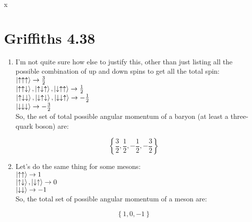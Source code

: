 x\documentclass[12pt]{article}
\begin{document}
\section*{Griffiths 4.38}
\begin{enumerate}[label=\alph*)]
\item I'm not quite sure how else to justify this, other than just listing all the possible combination of up and down spins to get all the total spin:\vspace{0.5em}\\
$\ket{\uparrow\uparrow\uparrow} \rightarrow \frac{3}{2}$\vspace{0.5em}\\
$\ket{\uparrow\uparrow\downarrow}, \ket{\uparrow\downarrow\uparrow}, \ket{\downarrow\uparrow\uparrow} \rightarrow \frac{1}{2}$\vspace{0.5em}\\
$\ket{\uparrow\downarrow\downarrow}, \ket{\downarrow\uparrow\downarrow}, \ket{\downarrow\downarrow\uparrow} \rightarrow -\frac{1}{2}$\vspace{0.5em}\\
$\ket{\downarrow\downarrow\downarrow} \rightarrow -\frac{3}{2}$\vspace{0.5em}\\
So, the set of total possible angular momentum of a baryon (at least a three-quark boson) are:

\[\boxed{\left\{\frac{3}{2}, \frac{1}{2}, -\frac{1}{2}, -\frac{3}{2}\right\}}\]

\item Let's do the same thing for some mesons:\vspace{0.5em}\\
$\ket{\uparrow\uparrow} \rightarrow 1$\vspace{0.5em}\\
$\ket{\uparrow \downarrow}, \ket{\downarrow\uparrow} \rightarrow 0$\vspace{0.5em}\\
$\ket{\downarrow\downarrow} \rightarrow -1$\vspace{0.5em}\\
So, the total set of possible angular momentum of a meson are:

\[\boxed{\left\{1, 0, -1\right\}}\]

\end{enumerate}
\newpage
\end{document}
